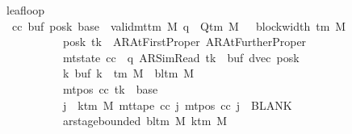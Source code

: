 \begin{isabellebody}
\ \ \ \ \ \ \ leaf{\isacharunderscore}{\kern0pt}loop{\isacharcolon}{\kern0pt}\isanewline
\ \ \ \ \ \ \ \ {\isachardoublequoteopen}{\isasymAnd}cc\ buf{}{\isacharprime}{\kern0pt}\ posk{\isacharprime}{\kern0pt}\ base{\isacharprime}{\kern0pt}{\isachardot}{\kern0pt}\ {\isasymlbrakk}\ valid{\isacharunderscore}{\kern0pt}mttm\ M{\isacharsemicolon}{\kern0pt}\ q\ {\isasymin}\ Q{\isacharunderscore}{\kern0pt}tm\ M{\isacharsemicolon}{\kern0pt}\ {}\ {\isasymle}\ block{\isacharunderscore}{\kern0pt}width\ {\isacharparenleft}{\kern0pt}{\isasymGamma}{\isacharunderscore}{\kern0pt}tm\ M{\isacharparenright}{\kern0pt}{\isacharsemicolon}{\kern0pt}\isanewline
\ \ \ \ \ \ \ \ \ \ \ \ \ \ \ \ \ posk{\isacharprime}{\kern0pt}\ tk\ {\isasymin}\ {\isacharbraceleft}{\kern0pt}AR{\isacharunderscore}{\kern0pt}AtFirstProper{\isacharcomma}{\kern0pt}\ AR{\isacharunderscore}{\kern0pt}AtFurtherProper{\isacharbraceright}{\kern0pt}{\isacharsemicolon}{\kern0pt}\isanewline
\ \ \ \ \ \ \ \ \ \ \ \ \ \ \ \ \ mt{\isacharunderscore}{\kern0pt}state\ cc\ {\isacharequal}{\kern0pt}\ {\isacharparenleft}{\kern0pt}q{\isacharcomma}{\kern0pt}\ AR{\isacharunderscore}{\kern0pt}SimRead{\isacharcomma}{\kern0pt}\ tk{\isacharcomma}{\kern0pt}\ {}{\isacharcomma}{\kern0pt}\ buf{}{\isacharprime}{\kern0pt}{\isacharcomma}{\kern0pt}\ dvec{\isacharcomma}{\kern0pt}\ posk{\isacharprime}{\kern0pt}{\isacharparenright}{\kern0pt}{\isacharsemicolon}{\kern0pt}\isanewline
\ \ \ \ \ \ \ \ \ \ \ \ \ \ \ \ \ {\isasymforall}k{\isachardot}{\kern0pt}\ buf{}{\isacharprime}{\kern0pt}\ k\ {\isasymin}\ {\isasymGamma}{\isacharunderscore}{\kern0pt}tm\ M\ {\isasymunion}\ {\isacharbraceleft}{\kern0pt}bl{\isacharunderscore}{\kern0pt}tm\ M{\isacharbraceright}{\kern0pt}{\isacharsemicolon}{\kern0pt}\isanewline
\ \ \ \ \ \ \ \ \ \ \ \ \ \ \ \ \ mt{\isacharunderscore}{\kern0pt}pos\ cc\ tk\ {\isacharequal}{\kern0pt}\ base{\isacharprime}{\kern0pt}{\isacharsemicolon}{\kern0pt}\isanewline
\ \ \ \ \ \ \ \ \ \ \ \ \ \ \ \ \ {\isasymforall}j\ {\isasymge}\ k{\isacharunderscore}{\kern0pt}tm\ M{\isachardot}{\kern0pt}\ mt{\isacharunderscore}{\kern0pt}tape\ cc\ j\ {\isacharparenleft}{\kern0pt}mt{\isacharunderscore}{\kern0pt}pos\ cc\ j{\isacharparenright}{\kern0pt}\ {\isacharequal}{\kern0pt}\ BLANK{}{\isacharsemicolon}{\kern0pt}\isanewline
\ \ \ \ \ \ \ \ \ \ \ \ \ \ \ \ \ ar{\isacharunderscore}{\kern0pt}stage{\isacharunderscore}{\kern0pt}bounded\ {\isacharparenleft}{\kern0pt}bl{\isacharunderscore}{\kern0pt}tm\ M{\isacharparenright}{\kern0pt}\ {\isacharparenleft}{\kern0pt}k{\isacharunderscore}{\kern0pt}tm\ M{\isacharparenright}{\kern0pt}\isanewline

\end{isabellebody}
